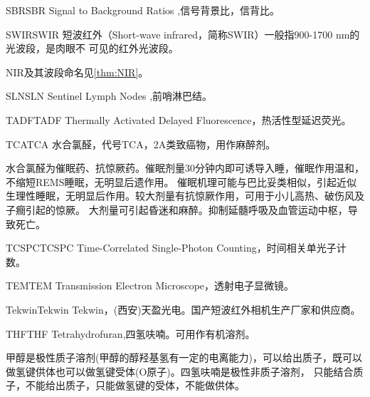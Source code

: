 \documentclass[cn,11pt,chinese]{elegantbook}
\begin{document}
\begin{theorem}{SBR}{SBR} 
Signal to Background Ratios ,信号背景比，信背比。

\end{theorem} 

 
\begin{theorem}{SWIR}{SWIR} 
  短波红外（Short-wave infrared，简称SWIR）一般指900-1700 nm的光波段，是肉眼不
  可见的红外光波段。
  \end{theorem} 
\begin{note}
  NIR及其波段命名见\vref{thm:NIR}。
\end{note}

\begin{theorem}{SLN}{SLN} 
  Sentinel Lymph Nodes ,前哨淋巴结。
  \end{theorem} 


  \begin{theorem}{TADF}{TADF} 
    Thermally Activated Delayed Fluorescence，热活性型延迟荧光。
    \end{theorem}  


\begin{theorem}{TCA}{TCA} 
  水合氯醛，代号TCA，2A类致癌物，用作麻醉剂。

  水合氯醛为催眠药、抗惊厥药。催眠剂量30分钟内即可诱导入睡，催眠作用温和，不缩短REMS睡眠，无明显后遗作用。
  催眠机理可能与巴比妥类相似，引起近似生理性睡眠，无明显后作用。较大剂量有抗惊厥作用，可用于小儿高热、破伤风及子癎引起的惊厥。
  大剂量可引起昏迷和麻醉。抑制延髓呼吸及血管运动中枢，导致死亡。
\end{theorem}  

\begin{theorem}{TCSPC}{TCSPC} 
  Time-Correlated Single-Photon Counting，时间相关单光子计数。
\end{theorem}  

\begin{theorem}{TEM}{TEM} 
  Transmission Electron Microscope，透射电子显微镜。
\end{theorem}  

\begin{theorem}{Tekwin}{Tekwin} 
  Tekwin，(西安)天盈光电。国产短波红外相机生产厂家和供应商。
\end{theorem}  

\begin{theorem}{THF}{THF} 
Tetrahydrofuran,四氢呋喃。可用作有机溶剂。
\end{theorem}  

\begin{remark}
甲醇是极性质子溶剂(甲醇的醇羟基氢有一定的电离能力)，可以给出质子，既可以做氢键供体也可以做氢键受体(O原子)。四氢呋喃是极性非质子溶剂，
只能结合质子，不能给出质子，只能做氢键的受体，不能做供体。
\end{remark}
\end{document}
